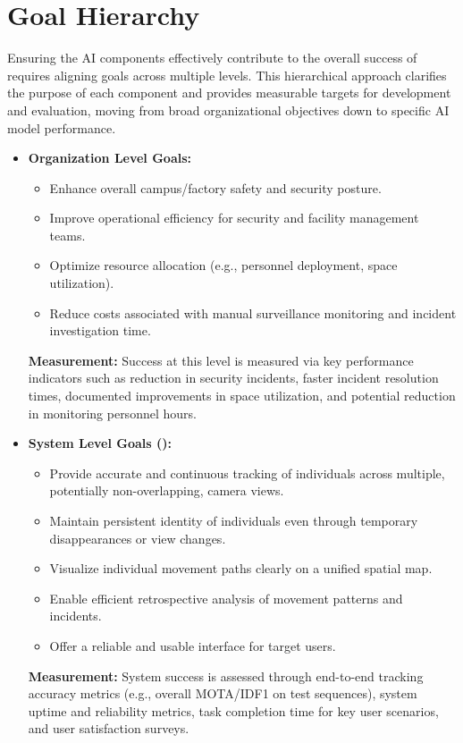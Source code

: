 \section{Goal Hierarchy}
\label{section:goal_hierarchy} %
Ensuring the AI components effectively contribute to the overall success of \usevar{\srsTitle} requires aligning goals across multiple levels. This hierarchical approach clarifies the purpose of each component and provides measurable targets for development and evaluation, moving from broad organizational objectives down to specific AI model performance.
\begin{itemize}
    \item \textbf{Organization Level Goals:}
        \begin{itemize}
            \item Enhance overall campus/factory safety and security posture.
            \item Improve operational efficiency for security and facility management teams.
            \item Optimize resource allocation (e.g., personnel deployment, space utilization).
            \item Reduce costs associated with manual surveillance monitoring and incident investigation time.
        \end{itemize}
        \textbf{Measurement:} Success at this level is measured via key performance indicators such as reduction in security incidents, faster incident resolution times, documented improvements in space utilization, and potential reduction in monitoring personnel hours.
    \item \textbf{System Level Goals (\usevar{\srsTitle}):}
        \begin{itemize}
            \item Provide accurate and continuous tracking of individuals across multiple, potentially non-overlapping, camera views.
            \item Maintain persistent identity of individuals even through temporary disappearances or view changes.
            \item Visualize individual movement paths clearly on a unified spatial map.
            \item Enable efficient retrospective analysis of movement patterns and incidents.
            \item Offer a reliable and usable interface for target users.
        \end{itemize}
        \textbf{Measurement:} System success is assessed through end-to-end tracking accuracy metrics (e.g., overall MOTA/IDF1 on test sequences), system uptime and reliability metrics, task completion time for key user scenarios, and user satisfaction surveys.


\end{itemize}
